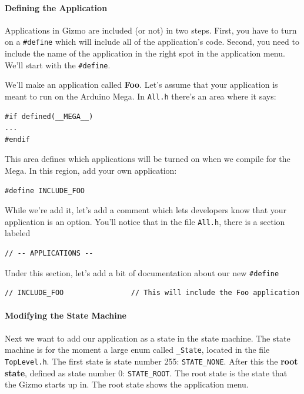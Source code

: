 \documentclass{article}
\begin{document}
\paragraph{Defining the Application}
Applications in Gizmo are included (or not) in two steps.  First, you have to turn on a \texttt{\#define} which will include all of the application's code.  Second, you need to include the name of the application in the right spot in the application menu.  We'll start with the \texttt{\#define}.

We'll make an application called {\bf Foo}.  Let's assume that your application is meant to run on the Arduino Mega.  In \texttt{All.h} there's an area where it says:

\begin{verbatim}
#if defined(__MEGA__)
...
#endif
\end{verbatim}

This area defines which applications will be turned on when we compile for the Mega.  In this region, add 
your own application:

\begin{verbatim}
#define INCLUDE_FOO
\end{verbatim}

While we're add it, let's add a comment which lets developers know that your application is an option.  You'll notice that in the file \texttt{All.h}, there is a section labeled

\begin{verbatim}
// -- APPLICATIONS --
\end{verbatim}

Under this section, let's add a bit of documentation about our new \texttt{\#define}

\begin{verbatim}
// INCLUDE_FOO                // This will include the Foo application
\end{verbatim}

\paragraph{Modifying the State Machine}
Next we want to add our application as a state in the state machine.  The state machine is for the moment a large enum called \texttt{\_State}, located in the file \texttt{TopLevel.h}.  The first state is state number 255: \texttt{STATE\_NONE}.  After this the {\bf root state}, defined as state number 0: \texttt{STATE\_ROOT}.  The root state is the state that the Gizmo starts up in.  The root state shows the application menu.
\end{document}
